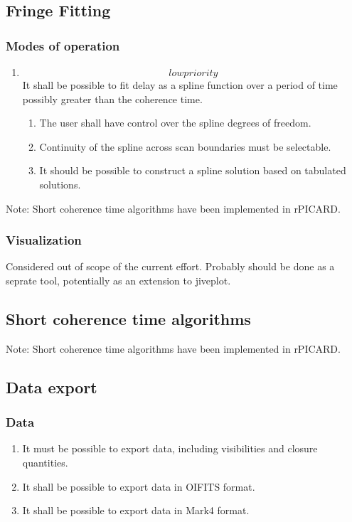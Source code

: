 \documentclass[11pt,a4paper]{article}
\begin{document}
\subsection{Fringe Fitting}

\subsubsection{Modes of operation}

\begin{enumerate}[subsubseclist]

\item \[low priority\] It shall be possible to fit delay as a spline
  function over a period of time possibly greater than the coherence
  time.

  \begin{enumerate}[subsubsecsublist]

  \item The user shall have control over the spline degrees of freedom.

  \item Continuity of the spline across scan boundaries must be selectable.

  \item It should be possible to construct a spline solution based on
    tabulated solutions.

  \end{enumerate}

\end{enumerate}

Note: Short coherence time algorithms have been implemented in rPICARD.

\subsubsection{Visualization}

Considered out of scope of the current effort.  Probably should be
done as a seprate tool, potentially as an extension to jiveplot.

\subsection{Short coherence time algorithms}

Note: Short coherence time algorithms have been implemented in rPICARD.

\subsection{Data export}

\subsubsection{Data}

\begin{enumerate}[subsubseclist]
  \item It must be possible to export data, including visibilities and
    closure quantities.

  \item It shall be possible to export data in OIFITS format.

  \item It shall be possible to export data in Mark4 format.
    
\end{enumerate}
\end{document}
